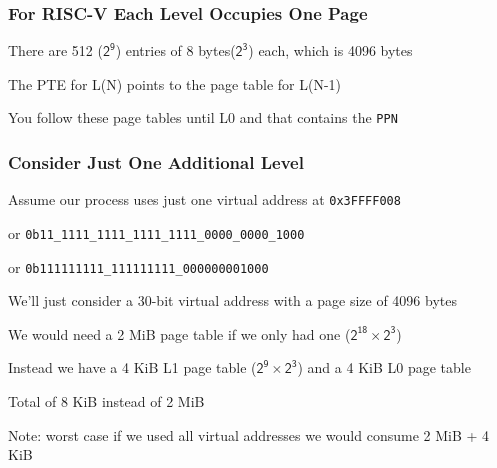   \begin{frame}
    \frametitle{For RISC-V Each Level Occupies One Page}

    There are 512 ($\mathsf{2^9}$) entries of 8 bytes($\mathsf{2^3}$) each, which is 4096 bytes

    \vspace{2em}

    The PTE for L(N) points to the page table for L(N-1)

    \vspace{2em}

    You follow these page tables until L0 and that contains the \texttt{PPN}
  \end{frame}

  \begin{frame}
    \frametitle{Consider Just One Additional Level}

    Assume our process uses just one virtual address at \texttt{0x3FFFF008}

    \hspace{2em} or \texttt{0b11\_1111\_1111\_1111\_1111\_0000\_0000\_1000}

    \hspace{2em} or \texttt{0b111111111\_111111111\_000000001000}

    \vspace{2em}

    We'll just consider a 30-bit virtual address with a page size of 4096 bytes

    \hspace{2em} We would need a 2 MiB page table if we only had one ($\mathsf{2^{18} \times 2^{3}}$)

    \vspace{2em}

    Instead we have a 4 KiB L1 page table ($\mathsf{2^9 \times 2^{3}}$) and a 4 KiB L0 page table

    \hspace{2em} Total of 8 KiB instead of 2 MiB

    \vspace{2em}

    Note: worst case if we used all virtual addresses we would consume 2 MiB + 4 KiB
  \end{frame}

